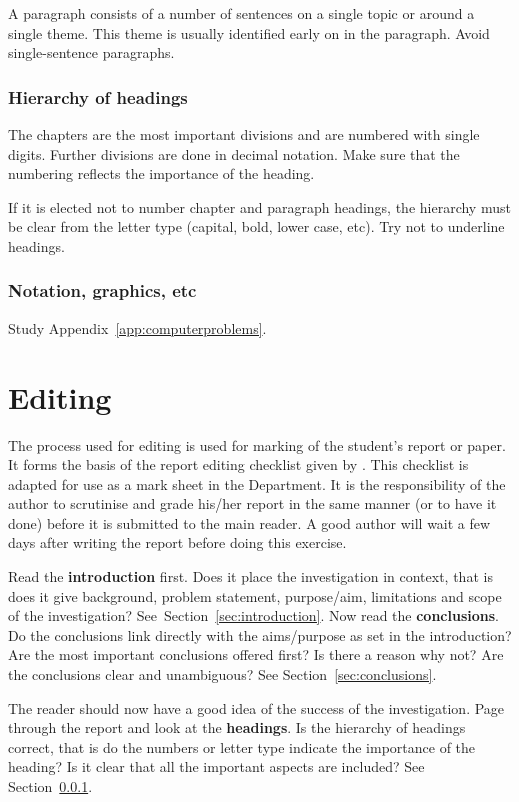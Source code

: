 \documentclass[a5paper, 10pt]{article}
\newcommand{\strongemph}[1]{\textbf{#1}}
\begin{document}
A paragraph consists of a number of sentences on a single topic or around a single theme.  
This theme is usually identified early on in the paragraph.
Avoid single-sentence paragraphs.

\subsubsection{Hierarchy of headings}
\label{sec:hierarchy-headings}
The chapters are the most important divisions and are numbered with
single digits.  Further divisions are done in decimal notation.  Make
sure that the numbering reflects the importance of the heading.

If it is elected not to number chapter and paragraph headings, the
hierarchy must be clear from the letter type (capital, bold, lower
case, etc).  Try not to underline headings.

\subsubsection{Notation, graphics, etc}
Study Appendix~\ref{app:computerproblems}.

\section{Editing}
\label{cha:editing}
The process used for editing is used for marking of the student's
report or paper.  It forms the basis of the report editing checklist
given by \citet[176]{bruckmanmandersloot}.  This checklist is adapted
for use as a mark sheet in the Department.  It is the responsibility
of the author to scrutinise and grade his/her report in the same
manner (or to have it done) before it is submitted to the main reader.
A good author will wait a few days after writing the report before
doing this exercise.

Read the \strongemph{introduction} first.  Does it place the
investigation in context, that is does it give background, problem
statement, purpose/aim, limitations and scope of the investigation?
See~Section~\ref{sec:introduction}.  Now read the
\strongemph{conclusions}.  Do the conclusions link directly with the
aims/purpose as set in the introduction?  Are the most important
conclusions offered first?  Is there a reason why not?  Are the
conclusions clear and unambiguous?  See
Section~\ref{sec:conclusions}.

The reader should now have a good idea of the success of the
investigation.  Page through the report and look at the
\strongemph{headings}.  Is the hierarchy of headings correct, that is do
the numbers or letter type indicate the importance of the heading?  Is
it clear that all the important aspects are included?  See
Section~\ref{sec:hierarchy-headings}.
\end{document}
